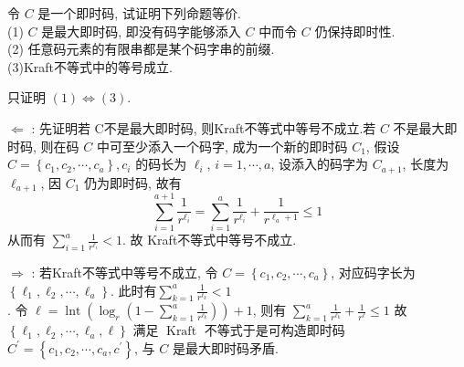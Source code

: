 \begin{exercise}
令 $ C $ 是一个即时码, 试证明下列命题等价.\\
(1) $ C $ 是最大即时码, 即没有码字能够添入 $ C $ 中而令 $ C $ 仍保持即时性.\\
(2) 任意码元素的有限串都是某个码字串的前缀.\\
(3)Kraft不等式中的等号成立.
\end{exercise}
\begin{solution}
只证明 $ (1) \Longleftrightarrow(3) $.

$ \Leftarrow $ : 先证明若 C不是最大即时码, 则Kraft不等式中等号不成立.若 $ C $ 不是最大即时码, 则在码 $ C $ 中可至少添入一个码字, 成为一个新的即时码 $ C_{1} $, 假设 $ C=\left\{c_{1}, c_{2}, \cdots, c_{a}\right\}, c_{i} $ 的码长为 $ \ell_{i} $, $ i=1, \cdots, a $, 设添入的码字为 $ C_{a+1} $, 长度为 $ \ell_{a+1} $, 因 $ C_{1} $ 仍为即时码, 故有
$$
\sum_{i=1}^{a+1} \frac{1}{r^{\ell_{i}}}=\sum_{i=1}^{a} \frac{1}{r^{\ell_{i}}}+\frac{1}{r^{\ell_{a}+1}} \leq 1
$$
从而有 $ \sum\limits_{i=1}^{a} \frac{1}{r^{\ell_{i}}}<1 $. 故 Kraft不等式中等号不成立.

$ \Rightarrow $ : 若Kraft不等式中等号不成立, 令 $ C=\left\{c_{1}, c_{2}, \cdots, c_{a}\right\} $, 对应码字长为 $ \left\{\ell_{1}, \ell_{2}, \cdots, \ell_{a}\right\} $. 此时有$\sum\limits_{k=1}^{a} \frac{1}{r^{\ell_{k}}}<1$
$.
\text { 令 } \ell=\operatorname{lnt}\left(\log _{r}\left(1-\sum\limits_{k=1}^{a} \frac{1}{r^{\ell_{k}}}\right)\right)+1$,
则有 $ \sum\limits_{k=1}^{a} \frac{1}{r^{\ell_{k}}}+\frac{1}{r^{\ell}} \leq 1 $ 故 $ \left\{\ell_{1}, \ell_{2}, \cdots, \ell_{a}, \ell\right\} $ 满足 $ \operatorname{Kraft} $ 不等式于是可构造即时码 $ C^{\prime}=\left\{c_{1}, c_{2}, \cdots, c_{a}, c^{\prime}\right\} $, 与 $ C $ 是最大即时码矛盾.
\end{solution}


